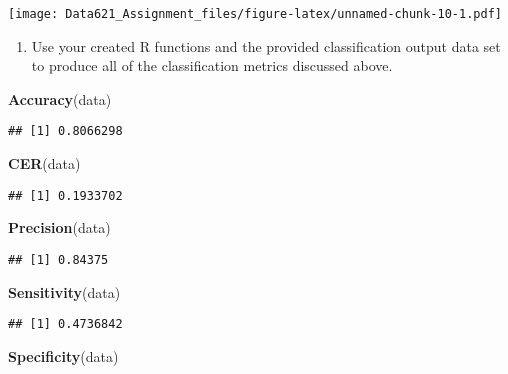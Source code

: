 \documentclass[]{article}
\newenvironment{Shaded}{\begin{snugshade}}{\end{snugshade}}
\newcommand{\KeywordTok}[1]{\textcolor[rgb]{0.13,0.29,0.53}{\textbf{#1}}}
\newcommand{\NormalTok}[1]{#1}
\providecommand{\tightlist}{%
  \setlength{\itemsep}{0pt}\setlength{\parskip}{0pt}}
\begin{document}
\texttt{[image: Data621\_Assignment\_files/figure-latex/unnamed-chunk-10-1.pdf]}

\begin{enumerate}
\def\labelenumi{\arabic{enumi}.}
\setcounter{enumi}{10}
\tightlist
\item
  Use your created R functions and the provided classification output
  data set to produce all of the classification metrics discussed above.
\end{enumerate}

\begin{Shaded}
\begin{Highlighting}[]
\KeywordTok{Accuracy}\NormalTok{(data)}
\end{Highlighting}
\end{Shaded}

\begin{verbatim}
## [1] 0.8066298
\end{verbatim}

\begin{Shaded}
\begin{Highlighting}[]
\KeywordTok{CER}\NormalTok{(data)}
\end{Highlighting}
\end{Shaded}

\begin{verbatim}
## [1] 0.1933702
\end{verbatim}

\begin{Shaded}
\begin{Highlighting}[]
\KeywordTok{Precision}\NormalTok{(data)}
\end{Highlighting}
\end{Shaded}

\begin{verbatim}
## [1] 0.84375
\end{verbatim}

\begin{Shaded}
\begin{Highlighting}[]
\KeywordTok{Sensitivity}\NormalTok{(data)}
\end{Highlighting}
\end{Shaded}

\begin{verbatim}
## [1] 0.4736842
\end{verbatim}

\begin{Shaded}
\begin{Highlighting}[]
\KeywordTok{Specificity}\NormalTok{(data)}
\end{Highlighting}
\end{Shaded}
\end{document}
